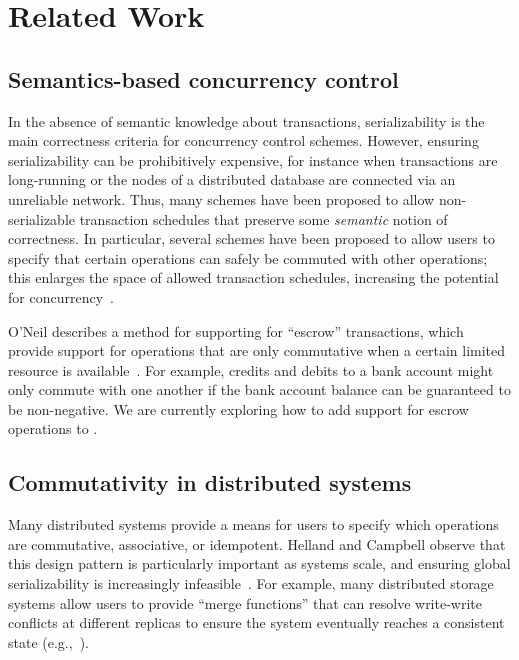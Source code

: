 \section{Related Work}
\label{sec:relwork}


\subsection{Semantics-based concurrency control}
In the absence of semantic knowledge about transactions, serializability is the
main correctness criteria for concurrency control schemes. However, ensuring
serializability can be prohibitively expensive, for instance when transactions
are long-running or the nodes of a distributed database are connected via an
unreliable network. Thus, many schemes have been proposed to allow
non-serializable transaction schedules that preserve some \emph{semantic} notion
of correctness. In particular, several schemes have been proposed to allow users
to specify that certain operations can safely be commuted with other operations;
this enlarges the space of allowed transaction schedules, increasing the
potential for concurrency~\cite{Farrag1989,Garcia-Molina1983,Weihl1988}.


O'Neil describes a method for supporting for ``escrow'' transactions, which
provide support for operations that are only commutative when a certain limited
resource is available~\cite{O'Neil1986}. For example, credits and debits to a
bank account might only commute with one another if the bank account balance can
be guaranteed to be non-negative. We are currently exploring how to add support
for escrow operations to \lang.


\subsection{Commutativity in distributed systems}
Many distributed systems provide a means for users to specify which operations
are commutative, associative, or idempotent. Helland and Campbell observe that
this design pattern is particularly important as systems scale, and ensuring
global serializability is increasingly infeasible~\cite{Helland2009}. For
example, many distributed storage systems allow users to provide ``merge
functions'' that can resolve write-write conflicts at different replicas to
ensure the system eventually reaches a consistent state
(e.g.,~\cite{DeCandia2007,statebox,Lloyd2011,Power2010,Terry1995}).

